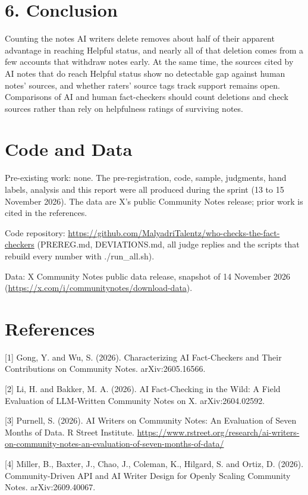 \documentclass[10.5pt]{article}
\begin{document}
\section*{6. Conclusion}
Counting the notes AI writers delete removes about half of their apparent advantage in reaching Helpful status, and nearly all of that deletion comes from a few accounts that withdraw notes early. At the same time, the sources cited by AI notes that do reach Helpful status show no detectable gap against human notes' sources, and whether raters' source tags track support remains open. Comparisons of AI and human fact-checkers should count deletions and check sources rather than rely on helpfulness ratings of surviving notes.

\section*{Code and Data}
Pre-existing work: none. The pre-registration, code, sample, judgments, hand labels, analysis and this report were all produced during the sprint (13 to 15 November 2026). The data are X's public Community Notes release; prior work is cited in the references.

Code repository: \url{https://github.com/MalyadriTalentz/who-checks-the-fact-checkers} (PREREG.md, DEVIATIONS.md, all judge replies and the scripts that rebuild every number with ./run\_all.sh).

Data: X Community Notes public data release, snapshot of 14 November 2026 (\url{https://x.com/i/communitynotes/download-data}).

\section*{References}
{\small [1] Gong, Y. and Wu, S. (2026). Characterizing AI Fact-Checkers and Their Contributions on Community Notes. arXiv:2605.16566.}

{\small [2] Li, H. and Bakker, M. A. (2026). AI Fact-Checking in the Wild: A Field Evaluation of LLM-Written Community Notes on X. arXiv:2604.02592.}

{\small [3] Purnell, S. (2026). AI Writers on Community Notes: An Evaluation of Seven Months of Data. R Street Institute. \url{https://www.rstreet.org/research/ai-writers-on-community-notes-an-evaluation-of-seven-months-of-data/}}

{\small [4] Miller, B., Baxter, J., Chao, J., Coleman, K., Hilgard, S. and Ortiz, D. (2026). Community-Driven API and AI Writer Design for Openly Scaling Community Notes. arXiv:2609.40067.}
\end{document}
